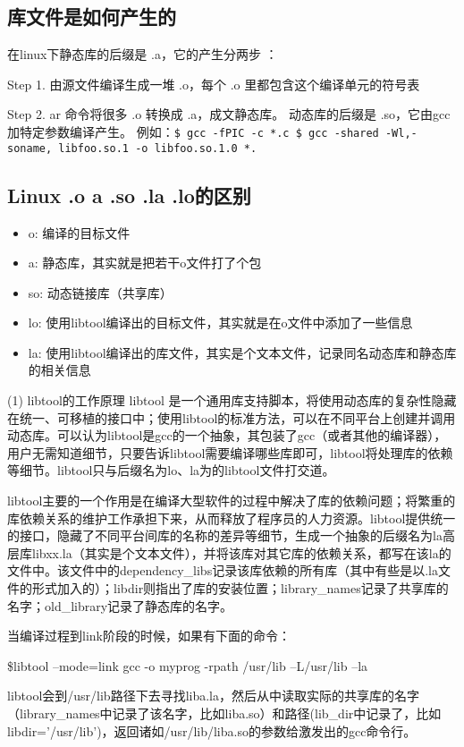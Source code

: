 \subsection{库文件是如何产生的}
在linux下静态库的后缀是 .a，它的产生分两步 ：

Step 1. 由源文件编译生成一堆 .o，每个 .o 里都包含这个编译单元的符号表 
  
Step 2. ar 命令将很多 .o 转换成  .a，成文静态库。 动态库的后缀是 .so，它由gcc加特定参数编译产生。 例如：\verb|$ gcc -fPIC -c *.c $ gcc -shared -Wl,-soname, libfoo.so.1 -o libfoo.so.1.0 *.| 



\subsection{Linux .o a .so .la .lo的区别}
\begin{itemize}
\item o: 编译的目标文件
\item a: 静态库，其实就是把若干o文件打了个包
\item so: 动态链接库（共享库）
\item lo: 使用libtool编译出的目标文件，其实就是在o文件中添加了一些信息
\item la: 使用libtool编译出的库文件，其实是个文本文件，记录同名动态库和静态库的相关信息
\end{itemize}

(1) libtool的工作原理 
libtool 是一个通用库支持脚本，将使用动态库的复杂性隐藏在统一、可移植的接口中；使用libtool的标准方法，可以在不同平台上创建并调用动态库。可以认为libtool是gcc的一个抽象，其包装了gcc（或者其他的编译器），用户无需知道细节，只要告诉libtool需要编译哪些库即可，libtool将处理库的依赖等细节。libtool只与后缀名为lo、la为的libtool文件打交道。 

libtool主要的一个作用是在编译大型软件的过程中解决了库的依赖问题；将繁重的库依赖关系的维护工作承担下来，从而释放了程序员的人力资源。libtool提供统一的接口，隐藏了不同平台间库的名称的差异等细节，生成一个抽象的后缀名为la高层库libxx.la（其实是个文本文件），并将该库对其它库的依赖关系，都写在该la的文件中。该文件中的dependency\_libs记录该库依赖的所有库（其中有些是以.la文件的形式加入的）；libdir则指出了库的安装位置；library\_names记录了共享库的名字；old\_library记录了静态库的名字。 

当编译过程到link阶段的时候，如果有下面的命令： 

\$libtool --mode=link gcc -o myprog -rpath /usr/lib –L/usr/lib –la 

libtool会到/usr/lib路径下去寻找liba.la，然后从中读取实际的共享库的名字（library\_names中记录了该名字，比如liba.so）和路径(lib\_dir中记录了，比如libdir=’/usr/lib’)，返回诸如/usr/lib/liba.so的参数给激发出的gcc命令行。 

